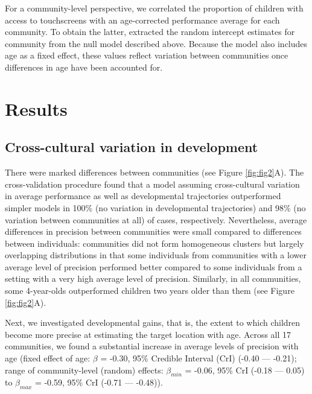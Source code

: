 \documentclass[
  man,floatsintext]{apa7}
\begin{document}
For a community-level perspective, we correlated the proportion of children with access to touchscreens with an age-corrected performance average for each community. To obtain the latter, extracted the random intercept estimates for community from the null model described above. Because the model also includes age as a fixed effect, these values reflect variation between communities once differences in age have been accounted for.

\hypertarget{results}{%
\section{Results}\label{results}}

\hypertarget{cross-cultural-variation-in-development}{%
\subsection{Cross-cultural variation in development}\label{cross-cultural-variation-in-development}}

There were marked differences between communities (see Figure \ref{fig:fig2}A). The cross-validation procedure found that a model assuming cross-cultural variation in average performance as well as developmental trajectories outperformed simpler models in 100\% (no variation in developmental trajectories) and 98\% (no variation between communities at all) of cases, respectively. Nevertheless, average differences in precision between communities were small compared to differences between individuals: communities did not form homogeneous clusters but largely overlapping distributions in that some individuals from communities with a lower average level of precision performed better compared to some individuals from a setting with a very high average level of precision. Similarly, in all communities, some 4-year-olds outperformed children two years older than them (see Figure \ref{fig:fig2}A).

Next, we investigated developmental gains, that is, the extent to which children become more precise at estimating the target location with age. Across all 17 communities, we found a substantial increase in average levels of precision with age (fixed effect of age: \(\beta\) = -0.30, 95\% Credible Interval (CrI) (-0.40 --- -0.21); range of community-level (random) effects: \(\beta_{min}\) = -0.06, 95\% CrI (-0.18 --- 0.05) to \(\beta_{max}\) = -0.59, 95\% CrI (-0.71 --- -0.48)).
\end{document}
